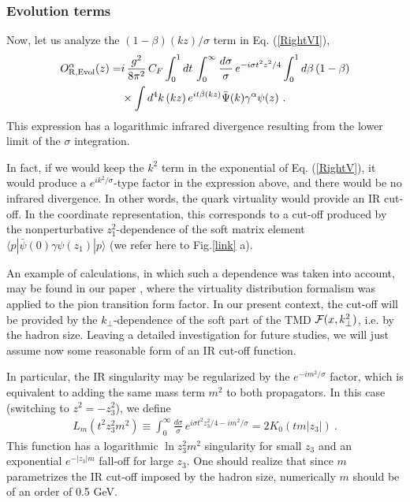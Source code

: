 \documentclass[final,5p,times,twocolumn]{elsarticle}
\begin{document}
  \subsubsection{Evolution  terms}
 
Now, let us analyze  the $(1-\beta) (kz)/ \sigma$    term  in Eq. (\ref{RightVI}),   
  \begin{align} 
  O^\alpha_{\rm R, Evol}  (z)  =& i    \,      \frac{ g^2}{8 \pi^2} \, C_F  \int_0^1 dt \, 
    \int_0^\infty \frac{d\sigma}{\sigma}\, e^{-  i \sigma
    t^2 z^2/4}   \int_0^1 d \beta \, (1-\beta)  \nonumber \\ &  \times 
     \int d^4 k \,    (kz)\, 
     e^{i  t \beta  (k z)} 
   \bar \Psi (k)    \gamma^\alpha \psi (z)
   \ .
    \label{LogIn}
 \end{align}
 This expression   has  
 a   logarithmic    infrared divergence  resulting from the 
 lower limit of the $\sigma $ integration.
 
 In fact, if we would keep the $k^2$ term in the exponential 
 of Eq.  (\ref{RightV}), it would produce a  $e^{ik^2/\sigma}$-type factor
 in the expression above, and there would be no infrared divergence. 
 In other words, the quark  virtuality would provide an IR cut-off. 
 In the coordinate representation, this corresponds to a cut-off 
 produced by the nonperturbative $z_1^2$-dependence of the 
 soft matrix element  $\langle p|\bar \psi (0) \gamma \psi (z_1) |p \rangle$ 
 (we refer here to Fig.\ref{link} a).
 
 An example of calculations, in which such a dependence was taken into account,
 may be found in our paper \cite{Radyushkin:2015gpa}, where the virtuality 
 distribution formalism was applied to the pion  transition form factor. 
 In our  present  context, the cut-off will be provided by 
 the $k_\perp$-dependence of the soft part of the TMD ${\cal  F} (x, k_\perp^2)$,
 i.e. by  the hadron size. 
 Leaving  a detailed investigation for future studies, we 
 will just  assume now some reasonable form   of  an IR cut-off function.
 
In  particular, the IR singularity may be  regularized  by the 
  $e^{-i m^2/\sigma}$ factor,
which is equivalent  to  adding the same mass term $m^2$ to both  propagators. 
In this case (switching to $z^2=-z_3^2$),  we define 
   \begin{align} 
    L_m (t^2z_3^2 m^2)  \equiv 
 \int_0^\infty    \frac{d \sigma }{ \sigma }\,  e^{  i \sigma  t^2  z_3^2/4-i m^2/\sigma} =
 2 K_0 (t m |z_3|)  \   . 
    \label{Lzm}
 \end{align}
  This function has  a logarithmic $\ln z_3^2 m^2$ singularity
  for small $z_3$ and an exponential  $e^{-|z_3|m} $ fall-off  for large $z_3$.
  One should realize that since $m$ parametrizes 
  the IR cut-off imposed by the hadron size, numerically $m$  
  should be of an order of 0.5 GeV.
  
\end{document}

